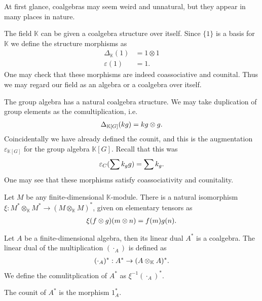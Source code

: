 \documentclass[../thesis.tex]{subfiles}
\begin{document}
            At first glance, coalgebras may seem weird and unnatural, but they appear in many places in nature.

            \begin{example}
                The field $\mathbb{K}$ can be given a coalgebra structure over itself. Since $\{1\}$ is a basis for $\mathbb{K}$ we define the structure morphisms as
                \begin{align*}
                    \Delta_{\mathbb{K}}(1) & = 1\otimes 1 \\
                    \varepsilon(1) & = 1.
                \end{align*}
                One may check that these morphisms are indeed coassociative and counital. Thus we may regard our field as an algebra or a coalgebra over itself.
            \end{example}

            \begin{example}
                The group algebra has a natural coalgebra structure. We may take duplication of group elements as the comultiplication, i.e.
                \begin{align*}
                    \Delta_{\mathbb{K}[G]}(kg) = kg\otimes g\tt{.}
                \end{align*}
                Coincidentally we have already defined the counit, and this is the augmentation $\varepsilon_{\mathbb{K}[G]}$ for the group algebra $\mathbb{K}[G]$. Recall that this was
                \begin{align*}
                    \varepsilon_C(\sum k_gg) = \sum k_g\tt{.}
                \end{align*}
                One may see that these morphisms satisfy coassociativity and counitality.
            \end{example}
            \begin{example}
                Let $M$ be any finite-dimensional $\mathbb{K}$-module. There is a natural isomorphism $\xi : M^* \otimes_\mathbb{K} M^* \rightarrow (M \otimes_\mathbb{K} M)^*$, given on elementary tensors as
                \begin{align*}
                    \xi(f \otimes g)(m \otimes n) = f(m)g(n)\tt{.}
                \end{align*}

                Let $A$ be a finite-dimensional algebra, then its linear dual $A^*$ is a coalgebra. The linear dual of the multiplication $(\cdot_A)$ is defined as 
                \begin{align*}
                    (\cdot_A)^* : A^* \rightarrow (A\otimes_\mathbb{K}A)^*\tt{.}
                \end{align*}
                We define the comulitplication of $A^*$ as $\xi^{-1}(\cdot_A)^*$.

                The counit of $A^*$ is the morphism $1_A^*$.
            \end{example}
\end{document}
